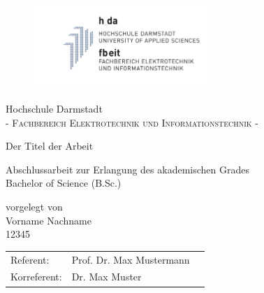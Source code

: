\pagestyle{empty} %

\begin{figure}[t]
	\centering
	\includegraphics[width=0.6\textwidth]{Pic/logo_fbeit}
\end{figure}


\begin{center}
\Large Hochschule Darmstadt \\
\normalsize \textsc{- Fachbereich Elektrotechnik und Informationstechnik -} \\

\vspace{105 pt}

\Huge Der Titel der Arbeit \\ 
\normalsize
\vspace{20 pt}

Abschlussarbeit zur Erlangung des akademischen Grades \\ 
Bachelor of Science (B.Sc.) 

\vspace{75 pt}


vorgelegt von \\
\vspace{5 pt}
Vorname Nachname \\
12345
\vspace{115 pt}

\begin{tabular}[h]{p{4cm}l l}
	Referent: & Prof. Dr. Max Mustermann\\
	Korreferent: & Dr. Max Muster
\end{tabular}


\end{center}
